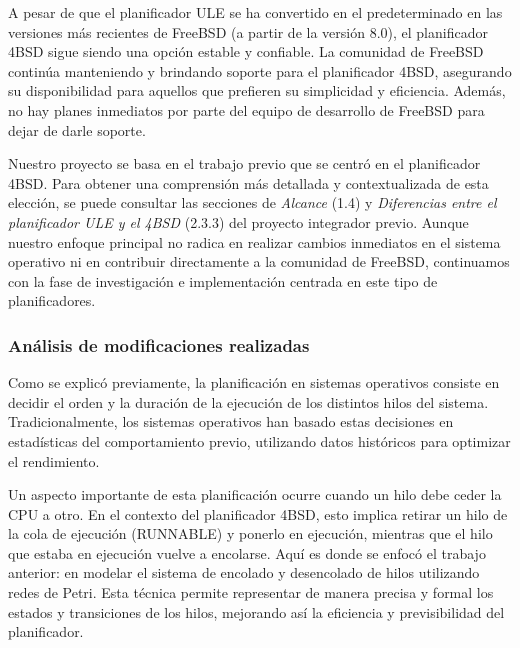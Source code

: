 A pesar de que el planificador ULE se ha convertido en el predeterminado en las versiones más recientes de FreeBSD (a partir de la versión 8.0), el planificador 4BSD sigue siendo una opción estable y confiable. La comunidad de FreeBSD continúa manteniendo y brindando soporte para el planificador 4BSD, asegurando su disponibilidad para aquellos que prefieren su simplicidad y eficiencia. Además, no hay planes inmediatos por parte del equipo de desarrollo de FreeBSD para dejar de darle soporte.\par

Nuestro proyecto se basa en el trabajo previo que se centró en el planificador 4BSD. Para obtener una comprensión más detallada y contextualizada de esta elección, se puede consultar las secciones de \textit{Alcance} (1.4) y  \textit{Diferencias entre el planificador ULE y el 4BSD} (2.3.3) del proyecto integrador previo\cite{bib1}. Aunque nuestro enfoque principal no radica en realizar cambios inmediatos en el sistema operativo ni en contribuir directamente a la comunidad de FreeBSD, continuamos con la fase de investigación e implementación centrada en este tipo de planificadores.\par


\subsubsection{Análisis de modificaciones realizadas}


Como se explicó previamente, la planificación en sistemas operativos consiste en decidir el orden y la duración de la ejecución de los distintos hilos del sistema. Tradicionalmente, los sistemas operativos han basado estas decisiones en estadísticas del comportamiento previo, utilizando datos históricos para optimizar el rendimiento.

Un aspecto importante de esta planificación ocurre cuando un hilo debe ceder la CPU a otro. En el contexto del planificador 4BSD, esto implica retirar un hilo de la cola de ejecución (RUNNABLE) y ponerlo en ejecución, mientras que el hilo que estaba en ejecución vuelve a encolarse. Aquí es donde se enfocó el trabajo anterior: en modelar el sistema de encolado y desencolado de hilos utilizando redes de Petri. Esta técnica permite representar de manera precisa y formal los estados y transiciones de los hilos, mejorando así la eficiencia y previsibilidad del planificador.

